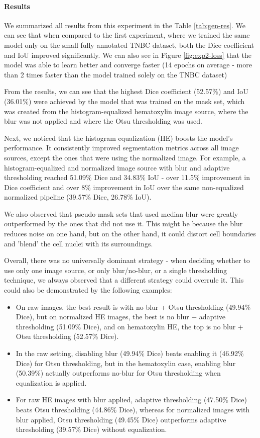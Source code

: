 \paragraph{Results}
We summarized all results from this experiment in the Table \ref{tab:gen-res}. We can see that when compared to the first experiment, where we trained the same model only on the small fully annotated TNBC dataset, both the Dice coefficient and IoU improved significantly. We can also see in Figure \ref{fig:exp2-loss} that the model was able to learn better and converge faster (14 epochs on average - more than 2 times faster than the model trained solely on the TNBC dataset)

From the results, we can see that the highest Dice coefficient (52.57\%) and IoU (36.01\%) were achieved by the model that was trained on the mask set, which was created from the histogram-equalized hematoxylin image source, where the blur was not applied and where the Otsu thresholding was used. 



Next, we noticed that the histogram equalization (HE) boosts the model's performance. It consistently improved segmentation metrics across all image sources, except the ones that were using the normalized image. For example, a histogram-equalized and normalized image source with blur and adaptive thresholding reached 51.09\% Dice and 34.83\% IoU - over 11.5\% improvement in Dice coefficient and over 8\% improvement in IoU over the same non-equalized normalized pipeline (39.57\% Dice, 26.78\% IoU).

We also observed that pseudo-mask sets that used median blur were greatly outperformed by the ones that did not use it. This might be because the blur reduces noise on one hand, but on the other hand, it could distort cell boundaries and 'blend' the cell nuclei with its surroundings.

Overall, there was no universally dominant strategy - when deciding whether to use only one image source, or only blur/no-blur, or a single thresholding technique, we always observed that a different strategy could overrule it. This could also be demonstrated by the following examples:

\begin{itemize}
    \item On raw images, the best result is with no blur + Otsu thresholding (49.94\% Dice), but on normalized HE images, the best is no blur + adaptive thresholding (51.09\% Dice), and on hematoxylin HE, the top is no blur + Otsu thresholding (52.57\% Dice).
    \item In the raw setting, disabling blur (49.94\% Dice) beats enabling it (46.92\% Dice) for Otsu thresholding, but in the hematoxylin case, enabling blur (50.39\%) actually outperforms no-blur for Otsu thresholding when equalization is applied.
    \item For raw HE images with blur applied, adaptive thresholding (47.50\% Dice) beats Otsu thresholding (44.86\% Dice), whereas for normalized images with blur applied, Otsu thresholding (49.45\% Dice) outperforms adaptive thresholding (39.57\% Dice) without equalization.
\end{itemize}

